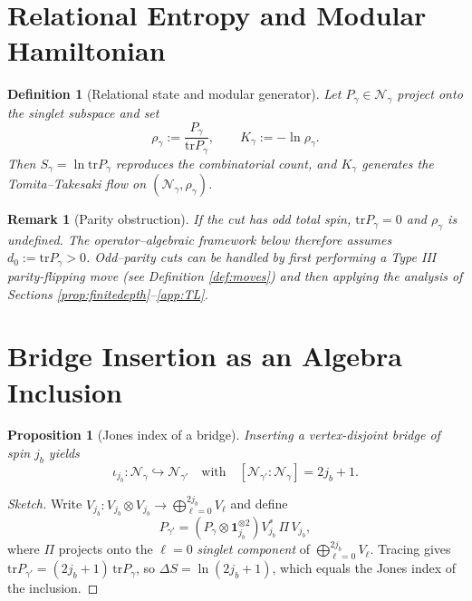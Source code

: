\documentclass[11pt]{article}
\newtheorem{definition}{Definition}[section]
\newtheorem{proposition}{Proposition}[section]
\newtheorem{remark}{Remark}[section]
\begin{document}
\section{Relational Entropy and Modular Hamiltonian}

\begin{definition}[Relational state and modular generator]
Let $P_{\gamma}\in\mathcal N_{\gamma}$ project onto the singlet subspace and set
\[
  \rho_{\gamma}:=\frac{P_{\gamma}}{\mathrm{tr}P_{\gamma}},\qquad
  K_{\gamma}:=-\ln\rho_{\gamma}.
\]
Then $S_{\gamma}=\ln\mathrm{tr}P_{\gamma}$ reproduces the combinatorial count,
and $K_{\gamma}$ generates the Tomita–Takesaki flow on
$(\mathcal N_{\gamma},\rho_{\gamma})$.
\end{definition}

\begin{remark}[Parity obstruction]\label{rem:parity}
If the cut has \emph{odd} total spin, $\mathrm{tr}P_{\gamma}=0$ and
$\rho_{\gamma}$ is undefined.
The operator–algebraic framework below therefore assumes
$d_0:=\mathrm{tr}P_{\gamma}>0$.
Odd–parity cuts can be handled by first performing a Type III
parity-flipping move (see Definition \ref{def:moves}) and then applying the
analysis of Sections \ref{prop:finitedepth}--\ref{app:TL}.
\end{remark}

\section{Bridge Insertion as an Algebra Inclusion}

\begin{proposition}[Jones index of a bridge]
Inserting a vertex-disjoint bridge of spin $j_b$ yields
\[
  \iota_{j_b}:\mathcal N_{\gamma}\hookrightarrow \mathcal N_{\gamma'}
\quad\text{with}\quad
  [\mathcal N_{\gamma'}:\mathcal N_{\gamma}] = 2j_b+1.
\]
\end{proposition}

\begin{proof}[Sketch]
Write
$V_{j_b}: V_{j_b}\!\otimes\! V_{j_b}\to
  \bigoplus_{\ell=0}^{2j_b}V_{\ell}$
and define
\[
  P_{\gamma'}=(P_{\gamma}\otimes\mathbf1_{j_b}^{\otimes2})
  V_{j_b}^{*}\,\Pi\,V_{j_b},
\]
where $\Pi$ projects onto the $\ell=0$ \emph{singlet component} of
$\bigoplus_{\ell=0}^{2j_b}V_{\ell}$.
Tracing gives
$\mathrm{tr}P_{\gamma'}=(2j_b+1)\,\mathrm{tr}P_{\gamma}$,
so $\Delta S=\ln(2j_b+1)$, which equals the Jones index of the inclusion.
\end{proof}
\end{document}
